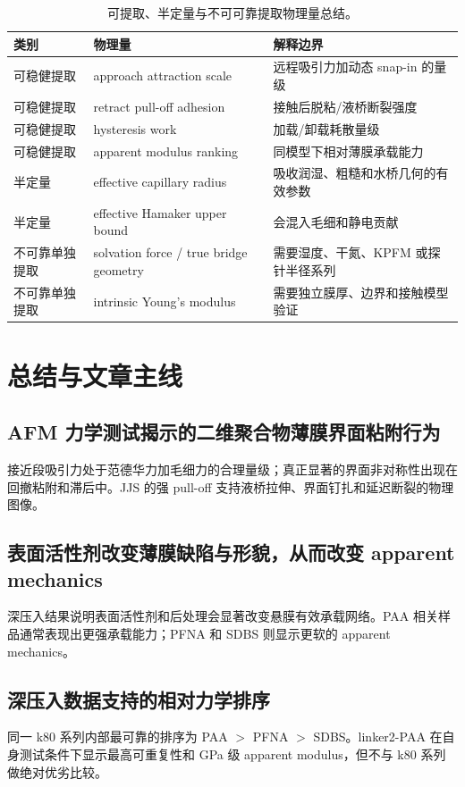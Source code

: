 \documentclass[UTF8,11pt,fontset=fandol]{ctexart}
\begin{document}
\begin{table}[htbp]
    \centering
    \caption{可提取、半定量与不可可靠提取物理量总结。}
    \label{tab:extractability}
    \small
    \begin{tabularx}{\linewidth}{lll}
        \toprule
        类别 & 物理量 & 解释边界 \\
        \midrule
        可稳健提取 & approach attraction scale & 远程吸引力加动态 snap-in 的量级 \\
        可稳健提取 & retract pull-off adhesion & 接触后脱粘/液桥断裂强度 \\
        可稳健提取 & hysteresis work & 加载/卸载耗散量级 \\
        可稳健提取 & apparent modulus ranking & 同模型下相对薄膜承载能力 \\
        半定量 & effective capillary radius & 吸收润湿、粗糙和水桥几何的有效参数 \\
        半定量 & effective Hamaker upper bound & 会混入毛细和静电贡献 \\
        不可靠单独提取 & solvation force / true bridge geometry & 需要湿度、干氮、KPFM 或探针半径系列 \\
        不可靠单独提取 & intrinsic Young's modulus & 需要独立膜厚、边界和接触模型验证 \\
        \bottomrule
    \end{tabularx}
\end{table}

\section{总结与文章主线}
\subsection{AFM 力学测试揭示的二维聚合物薄膜界面粘附行为}
接近段吸引力处于范德华力加毛细力的合理量级；真正显著的界面非对称性出现在回撤粘附和滞后中。JJS 的强 pull-off 支持液桥拉伸、界面钉扎和延迟断裂的物理图像。

\subsection{表面活性剂改变薄膜缺陷与形貌，从而改变 apparent mechanics}
深压入结果说明表面活性剂和后处理会显著改变悬膜有效承载网络。PAA 相关样品通常表现出更强承载能力；PFNA 和 SDBS 则显示更软的 apparent mechanics。

\subsection{深压入数据支持的相对力学排序}
同一 k80 系列内部最可靠的排序为 PAA $>$ PFNA $>$ SDBS。linker2-PAA 在自身测试条件下显示最高可重复性和 GPa 级 apparent modulus，但不与 k80 系列做绝对优劣比较。
\end{document}
